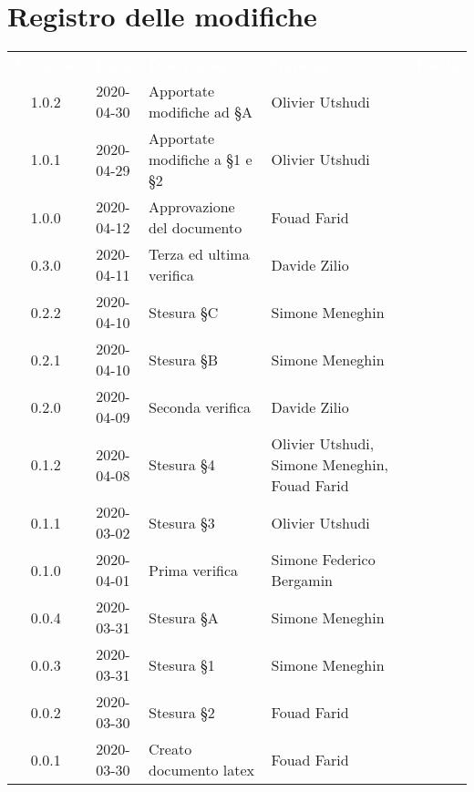 \section*{Registro delle modifiche}
{
	\centering
	\begin{longtable}{ c c  C{4cm}  C{3.5cm}  C{3.5cm} }
		\textcolor{white}{\textbf{Versione}} & \textcolor{white}{\textbf{Data}} & \textcolor{white}{\textbf{Descrizione}} & \textcolor{white}{\textbf{Nominativo}} & \textcolor{white}{\textbf{Ruolo}}\\		
		1.0.2 & 2020-04-30 & Apportate modifiche ad §A & Olivier Utshudi &\prog \\
		1.0.1 & 2020-04-29 & Apportate modifiche a §1 e §2 & Olivier Utshudi &\prog \\
		1.0.0 & 2020-04-12 & Approvazione del documento & Fouad Farid &\RdP{} \\
		0.3.0 & 2020-04-11 & Terza ed ultima verifica & Davide Zilio &\ver{} \\
		0.2.2 & 2020-04-10 & Stesura \S C & Simone Meneghin &\prog{} \\
		0.2.1 & 2020-04-10 & Stesura \S B & Simone Meneghin &\prog{} \\
		0.2.0 & 2020-04-09 & Seconda verifica & Davide Zilio &\ver{} \\
		0.1.2 & 2020-04-08 & Stesura \S 4 & Olivier Utshudi, Simone Meneghin, Fouad Farid &\prog{} \\
		0.1.1 & 2020-03-02 & Stesura \S 3 & Olivier Utshudi &\prog{} \\
		0.1.0 & 2020-04-01 & Prima verifica & Simone Federico Bergamin &\ver{} \\
		0.0.4 & 2020-03-31 & Stesura \S A & Simone Meneghin &\prog{} \\
		0.0.3 & 2020-03-31 & Stesura \S 1 & Simone Meneghin &\prog{} \\
		0.0.2 & 2020-03-30 & Stesura \S 2 & Fouad Farid &\prog{} \\
		0.0.1 & 2020-03-30 & Creato documento latex & Fouad Farid &\prog{}\\		
		
	\end{longtable}

}